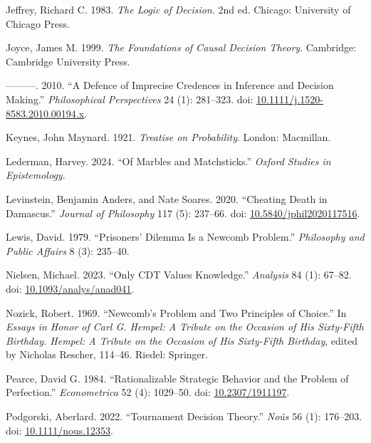 \documentclass[
  10pt,
  letterpaper,
  DIV=11,
  numbers=noendperiod,
  twoside]{scrartcl}
\newlength{\cslhangindent}
\newenvironment{CSLReferences}[2] %
 {\begin{list}{}{%
  \setlength{\itemindent}{0pt}
  \setlength{\leftmargin}{0pt}
  \setlength{\parsep}{0pt}
  \ifodd #1
   \setlength{\leftmargin}{\cslhangindent}
   \setlength{\itemindent}{-1\cslhangindent}
  \fi
  \setlength{\itemsep}{#2\baselineskip}}}
 {\end{list}}
\begin{document}
\begin{CSLReferences}{1}{0}
Jeffrey, Richard C. 1983. \emph{The Logic of Decision}. 2nd ed. Chicago:
University of Chicago Press.

Joyce, James M. 1999. \emph{The Foundations of Causal Decision Theory}.
Cambridge: Cambridge University Press.

---------. 2010. {``A Defence of Imprecise Credences in Inference and
Decision Making.''} \emph{Philosophical Perspectives} 24 (1): 281--323.
doi:
\href{https://doi.org/10.1111/j.1520-8583.2010.00194.x}{10.1111/j.1520-8583.2010.00194.x}.

Keynes, John Maynard. 1921. \emph{Treatise on Probability}. London:
Macmillan.

Lederman, Harvey. 2024. {``Of Marbles and Matchsticks.''} \emph{Oxford
Studies in Epistemology}.

Levinstein, Benjamin Anders, and Nate Soares. 2020. {``Cheating Death in
Damascus.''} \emph{Journal of Philosophy} 117 (5): 237--66. doi:
\href{https://doi.org/10.5840/jphil2020117516}{10.5840/jphil2020117516}.

Lewis, David. 1979. {``Prisoners' Dilemma Is a {N}ewcomb Problem.''}
\emph{Philosophy and Public Affairs} 8 (3): 235--40.

Nielsen, Michael. 2023. {``Only {CDT} Values Knowledge.''}
\emph{Analysis} 84 (1): 67--82. doi:
\href{https://doi.org/10.1093/analys/anad041}{10.1093/analys/anad041}.

Nozick, Robert. 1969. {``Newcomb's Problem and Two Principles of
Choice.''} In \emph{Essays in Honor of Carl {G}. Hempel: A Tribute on
the Occasion of His Sixty-Fifth Birthday. Hempel: A Tribute on the
Occasion of His Sixty-Fifth Birthday}, edited by Nicholas Rescher,
114--46. Riedel: Springer.

Pearce, David G. 1984. {``Rationalizable Strategic Behavior and the
Problem of Perfection.''} \emph{Econometrica} 52 (4): 1029--50. doi:
\href{https://doi.org/10.2307/1911197}{10.2307/1911197}.

Podgorski, Aberlard. 2022. {``Tournament Decision Theory.''}
\emph{No{û}s} 56 (1): 176--203. doi:
\href{https://doi.org/10.1111/nous.12353}{10.1111/nous.12353}.


\end{CSLReferences}
\end{document}

